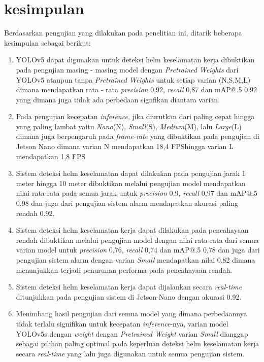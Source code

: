 \section{kesimpulan}
\label{sec:kesimpulan}

\par Berdasarkan pengujian yang dilakukan pada penelitian ini, ditarik beberapa kesimpulan sebagai berikut:

\begin{enumerate}[nolistsep]

    \item YOLOv5 dapat digunakan untuk deteksi helm keselamatan kerja dibuktikan pada pengujian masing - masing model dengan \emph{Pretrained Weights} dari YOLOv5 ataupun tanpa \emph{Pretrained Weights} untuk setiap varian (N,S,M,L) dimana mendapatkan rata - rata \emph{precision} 0,92, \emph{recall}  0,87 dan mAP@.5 0,92 yang dimana juga tidak ada perbedaan signfikan diantara varian.

    \item Pada pengujian kecepatan \emph{inference}, jika diurutkan dari paling cepat hingga yang paling lambat yaitu \emph{Nano}(N), \emph{Small}(S), \emph{Medium}(M), lalu \emph{Large}(L) dimana juga berpengaruh pada \emph{frame-rate} yang dibuktikan pada pengujian di Jetson Nano dimana varian N mendapatkan 18,4 FPShingga varian L mendapatkan 1,8 FPS

    \item Sistem deteksi helm keselamatan dapat dilakukan pada pengujian jarak 1 meter hingga 10 meter dibuktikan melalui pengujian model mendapatkan nilai rata-rata pada semua jarak untuk \emph{precision} 0,9, \emph{recall} 0,97 dan mAP@.5 0,98  dan juga dari pengujian sistem alarm mendapatkan akurasi paling rendah 0.92.

    \item Sistem deteksi helm keselamatan kerja dapat dilakukan pada pencahayaan rendah dibuktikan melalui pengujian model dengan nilai rata-rata dari semua varian model untuk \emph{precision} 0,76, \emph{recall} 0,74 dan mAP@.5 0,78 dan juga dari pengujian sistem alarm dengan varian \emph{Small} mendapatkan nilai 0,82 dimana menunjukkan terjadi penurunan performa pada pencahayaan rendah.

    \item Sistem deteksi helm keselamatan kerja dapat dijalankan secara \emph{real-time} ditunjukkan pada pengujian sistem di Jetson-Nano dengan akurasi 0.92.

    \item Menimbang hasil pengujian dari semua model yang dimana perbedaannya tidak terlalu signifikan untuk kecepatan \emph{inference}-nya, varian model YOLOv5s dengan \emph{weight} dengan \emph{Pretrained Weight} varian \emph{Small} dianggap sebagai pilihan paling optimal pada keperluan deteksi helm keselamatan kerja secara \emph{real-time} yang lalu juga digunakan untuk semua pengujian sistem.
    
\end{enumerate}

